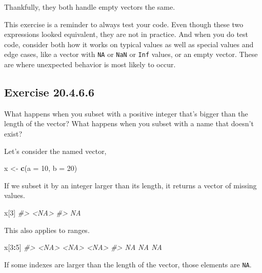 \documentclass[]{book}
\newenvironment{Shaded}{\begin{snugshade}}{\end{snugshade}}
\newcommand{\CommentTok}[1]{\textcolor[rgb]{0.56,0.35,0.01}{\textit{#1}}}
\newcommand{\DataTypeTok}[1]{\textcolor[rgb]{0.13,0.29,0.53}{#1}}
\newcommand{\DecValTok}[1]{\textcolor[rgb]{0.00,0.00,0.81}{#1}}
\newcommand{\KeywordTok}[1]{\textcolor[rgb]{0.13,0.29,0.53}{\textbf{#1}}}
\newcommand{\NormalTok}[1]{#1}
\newcommand{\OperatorTok}[1]{\textcolor[rgb]{0.81,0.36,0.00}{\textbf{#1}}}
\newcommand{\StringTok}[1]{\textcolor[rgb]{0.31,0.60,0.02}{#1}}
\theoremstyle{plain}
\theoremstyle{remark}
\begin{document}
Thankfully, they both handle empty vectors the same.

This exercise is a reminder to always test your code. Even though these two expressions looked
equivalent, they are not in practice. And when you do test code, consider both
how it works on typical values as well as special values and edge cases, like a
vector with \texttt{NA} or \texttt{NaN} or \texttt{Inf} values, or an empty vector. These are where
unexpected behavior is most likely to occur.

\hypertarget{exercise-20.4.6.6}{%
\subsection*{\texorpdfstring{Exercise {20.4.6.6}}{Exercise 20.4.6.6}}\label{exercise-20.4.6.6}}

What happens when you subset with a positive integer that's bigger than the length of the vector? What happens when you subset with a name that doesn't exist?

Let's consider the named vector,

\begin{Shaded}
\begin{Highlighting}[]
\NormalTok{x <-}\StringTok{ }\KeywordTok{c}\NormalTok{(}\DataTypeTok{a =} \DecValTok{10}\NormalTok{, }\DataTypeTok{b =} \DecValTok{20}\NormalTok{)}
\end{Highlighting}
\end{Shaded}

If we subset it by an integer larger than its length, it returns a vector of missing values.

\begin{Shaded}
\begin{Highlighting}[]
\NormalTok{x[}\DecValTok{3}\NormalTok{]}
\CommentTok{#> <NA> }
\CommentTok{#>   NA}
\end{Highlighting}
\end{Shaded}

This also applies to ranges.

\begin{Shaded}
\begin{Highlighting}[]
\NormalTok{x[}\DecValTok{3}\OperatorTok{:}\DecValTok{5}\NormalTok{]}
\CommentTok{#> <NA> <NA> <NA> }
\CommentTok{#>   NA   NA   NA}
\end{Highlighting}
\end{Shaded}

If some indexes are larger than the length of the vector, those elements are \texttt{NA}.
\end{document}
